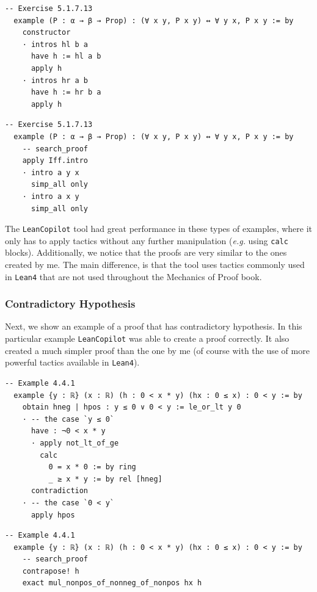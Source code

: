 \documentclass[12pt]{article}
\newcommand{\leancopilot}{\texttt{LeanCopilot} }
\begin{document}
\begin{minipage}{0.495\textwidth}
  \begin{lstlisting}[title={Human proof}]
  -- Exercise 5.1.7.13
  example (P : α → β → Prop) : (∀ x y, P x y) ↔ ∀ y x, P x y := by
    constructor
    · intros hl b a
      have h := hl a b
      apply h
    · intros hr a b
      have h := hr b a
      apply h
  \end{lstlisting}
\end{minipage}
\vline
\begin{minipage}{0.495\textwidth}
  \begin{lstlisting}[title={\leancopilot proof}]
  -- Exercise 5.1.7.13
  example (P : α → β → Prop) : (∀ x y, P x y) ↔ ∀ y x, P x y := by
    -- search_proof
    apply Iff.intro
    · intro a y x
      simp_all only
    · intro a x y
      simp_all only  
  \end{lstlisting}
\end{minipage}

The \leancopilot tool had great performance in these types of examples, where it only has to apply tactics without any further manipulation (\emph{e.g.} using \texttt{calc} blocks). Additionally, we notice that the proofs are very similar to the ones created by me. The main difference, is that the tool uses tactics commonly used in \texttt{Lean4} that are not used throughout the Mechanics of Proof book.


\subsubsection{Contradictory Hypothesis}
Next, we show an example of a proof that has contradictory hypothesis. In this particular example \leancopilot was able to create a proof correctly. It also created a much simpler proof than the one by me (of course with the use of more powerful tactics available in \texttt{Lean4}).

\begin{minipage}{0.495\textwidth}
  \begin{lstlisting}[title={Human proof}]
  -- Example 4.4.1 
  example {y : ℝ} (x : ℝ) (h : 0 < x * y) (hx : 0 ≤ x) : 0 < y := by
    obtain hneg | hpos : y ≤ 0 ∨ 0 < y := le_or_lt y 0
    · -- the case `y ≤ 0`
      have : ¬0 < x * y
      · apply not_lt_of_ge
        calc
          0 = x * 0 := by ring
          _ ≥ x * y := by rel [hneg]
      contradiction
    · -- the case `0 < y`
      apply hpos
  \end{lstlisting}
\end{minipage}
\vline
\begin{minipage}{0.495\textwidth}
  \begin{lstlisting}[title={\leancopilot proof}]
  -- Example 4.4.1 
  example {y : ℝ} (x : ℝ) (h : 0 < x * y) (hx : 0 ≤ x) : 0 < y := by
    -- search_proof
    contrapose! h
    exact mul_nonpos_of_nonneg_of_nonpos hx h
  \end{lstlisting}
\end{minipage}
\end{document}

